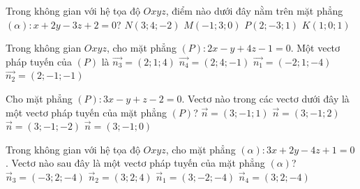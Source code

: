 \begin{ex}%
	Trong không gian với hệ tọa độ $Oxyz$, điểm nào dưới đây nằm trên mặt phẳng $(\alpha)\colon x+2y-3z+2=0$?
	\choice
	{$N(3;4;-2)$}
	{$M(-1;3;0)$}
	{$P(2;-3;1)$}
	{\True $K(1;0;1)$}
\end{ex}

\begin{ex}%
	Trong không gian $Oxyz$, cho mặt phẳng $(P)\colon 2x-y+4z-1=0$. Một vectơ pháp tuyến của $(P)$ là
	\choice
	{$\overrightarrow{n_3}=(2; 1; 4)$}
	{$\overrightarrow{n_4}=(2; 4;-1)$}
	{\True $\overrightarrow{n_1}=(-2; 1;-4)$}
	{$\overrightarrow{n_2}=(2;-1;-1)$}
\end{ex}

\begin{ex}%
	Cho mặt phẳng $(P)\colon 3x-y+z-2=0$. Vectơ nào trong các vectơ dưới đây là một vectơ pháp tuyến của mặt phẳng $(P)$?
	\choice
	{\True $\overrightarrow{n}=(3;-1;1)$}
	{$\overrightarrow{n}=(3;-1;2)$}
	{$\overrightarrow{n}=(3;-1;-2)$}
	{$\overrightarrow{n}=(3;-1;0)$}
\end{ex}

\begin{ex}%
	Trong không gian với hệ tọa độ $Oxyz$, cho mặt phẳng $(\alpha)\colon 3x+2y-4z+1=0$. Vectơ nào sau đây là một vectơ pháp tuyến của mặt phẳng $(\alpha)$?
	\choice
	{$\overrightarrow{n}_3=(-3;2;-4)$}
	{$\overrightarrow{n}_2=(3;2;4)$}
	{$\overrightarrow{n}_1=(3;-2;-4)$}
	{\True $\overrightarrow{n}_4=(3;2;-4)$}
\end{ex}

